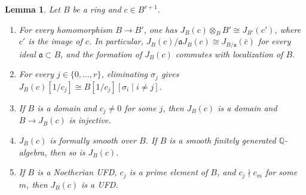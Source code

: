 \documentclass[11pt]{amsart}
\numberwithin{equation}{section}
\newtheorem{lemma}[theorem]{Lemma}
\theoremstyle{definition}
\newcommand{\Q}{\mathbb{Q}}
\newcommand{\fa}{\mathfrak{a}}
\begin{document}
\begin{lemma}\label{lem:jouanolou}
Let $B$ be a ring and $c\in B^{r+1}$.
\begin{enumerate}
\item For every homomorphism $B\to B'$, one has $J_B(c)\otimes_B B'\cong J_{B'}(c')$, where $c'$ is the image of $c$. In particular, $J_B(c)/\fa J_B(c)\cong J_{B/\fa}(\bar c)$ for every ideal $\fa\subset B$, and the formation of $J_B(c)$ commutes with localization of $B$.
\item For every $j\in\{0,\ldots,r\}$, eliminating $\sigma_j$ gives $J_B(c)[1/c_j]\cong B[1/c_j][\sigma_i\mid i\ne j]$.
\item If $B$ is a domain and $c_j\ne0$ for some $j$, then $J_B(c)$ is a domain and $B\to J_B(c)$ is injective.
\item $J_B(c)$ is formally smooth over $B$. If $B$ is a smooth finitely generated $\Q$-algebra, then so is $J_B(c)$.
\item If $B$ is a Noetherian UFD, $c_j$ is a prime element of $B$, and $c_j\nmid c_m$ for some $m$, then $J_B(c)$ is a UFD.
\end{enumerate}
\end{lemma}
\end{document}
